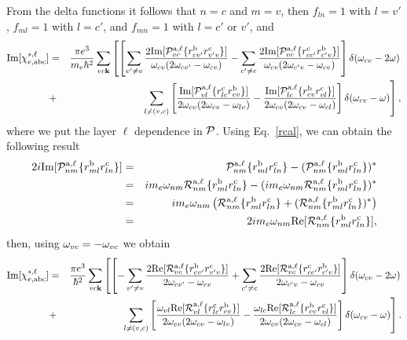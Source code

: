 \documentclass[floatfix,prb,aps,superscriptaddress,11pt,preprint]{revtex4}
\begin{document}
From the delta functions it follows that $n=c$ and $m=v$, then
$f_{ln}=1$ with $l=v'$,
$f_{ml}=1$ with $l=c'$, 
and
$f_{mn}=1$ with $l=c'$ or $v'$, and
\begin{eqnarray}\label{imchie3}
\mathrm{Im}[\chi_{e,\mathrm{a}\mathrm{b}\mathrm{c}}^{s,\ell}]
&=&
\frac{\pi e^3}{m_e\hbar^2} 
\sum_{vc\mathbf{k}}
\left[
\left[
\sum_{v'\ne v}
\frac{2\mathrm{Im}[{\cal P}^{\mathrm{a},\ell}_{vc}\{r^{\mathrm{b}}_{cv'}r^{\mathrm{c}}_{v'v}\}]
}{\omega_{cv}(2\omega_{cv'}-\omega_{cv})}
-
\sum_{c'\ne c}
\frac{2\mathrm{Im}[{\cal P}^{\mathrm{a},\ell}_{vc}\{r^{\mathrm{c}}_{cc'}r^{\mathrm{b}}_{c'v}\}]}
{\omega_{cv}(2\omega_{c'v}-\omega_{cv})}
\right]
\delta(\omega_{cv}-2\omega)
\right.
\nonumber\\
&+&
\left.
\sum_{l\neq(v,c)}
\left[
\frac{\mathrm{Im}[{\cal P}^{\mathrm{a},\ell}_{vl}\{r^{\mathrm{c}}_{lc}r^{\mathrm{b}}_{cv}\}]}
{2\omega_{cv}(2\omega_{cv}-\omega_{lv})}
-
\frac{\mathrm{Im}[{\cal P}^{\mathrm{a},\ell}_{lc}\{r^{\mathrm{b}}_{cv}r^{\mathrm{c}}_{vl}\}]}
{2\omega_{cv}(2\omega_{cv}-\omega_{cl})}
\right]
\delta(\omega_{cv}-\omega)
\right]
,
\end{eqnarray}  
where we put the layer $\ell$ dependence in ${\cal P}$.
Using Eq.~\eqref{rcal}, we can obtain the following result
\begin{eqnarray}\label{ptor}
2i\mathrm{Im}[{\cal P}^{\mathrm{a},\ell}_{nm}\{r^{\mathrm{b}}_{ml}r^{\mathrm{c}}_{ln}\}]
&=&
{\cal P}^{\mathrm{a},\ell}_{nm}\{r^{\mathrm{b}}_{ml}r^{\mathrm{c}}_{ln}\}
-
({\cal P}^{\mathrm{a},\ell}_{nm}\{r^{\mathrm{b}}_{ml}r^{\mathrm{c}}_{ln}\})^*
\nonumber\\
&=&
im_e\omega_{nm}{\cal R}^{\mathrm{a},\ell}_{nm}\{r^{\mathrm{b}}_{ml}r^{\mathrm{c}}_{ln}\}
-
(im_e\omega_{nm}{\cal R}^{\mathrm{a},\ell}_{nm}\{r^{\mathrm{b}}_{ml}r^{\mathrm{c}}_{ln}\})^*
\nonumber\\
&=&
im_e\omega_{nm}\left({\cal R}^{\mathrm{a},\ell}_{nm}\{r^{\mathrm{b}}_{ml}r^{\mathrm{c}}_{ln}\}
+
({\cal R}^{\mathrm{a},\ell}_{nm}\{r^{\mathrm{b}}_{ml}r^{\mathrm{c}}_{ln}\})^*
\right)
\nonumber\\
&=&
2im_e\omega_{nm}\mathrm{Re}[{\cal R}^{\mathrm{a},\ell}_{nm}\{r^{\mathrm{b}}_{ml}r^{\mathrm{c}}_{ln}\}]
,
\end{eqnarray}
then, using $\omega_{vc}=-\omega_{vc}$ we obtain
\begin{eqnarray}\label{imchie3n}
\mathrm{Im}[\chi_{e,\mathrm{a}\mathrm{b}\mathrm{c}}^{s,\ell}]
&=&
\frac{\pi e^3}{\hbar^2} 
\sum_{vc\mathbf{k}}
\left[
\left[
-\sum_{v'\ne v}
\frac{2\mathrm{Re}[{\cal R}^{\mathrm{a},\ell}_{vc}\{r^{\mathrm{b}}_{cv'}r^{\mathrm{c}}_{v'v}\}]
}{2\omega_{cv'}-\omega_{cv}}
+
\sum_{c'\ne c}
\frac{2\mathrm{Re}[{\cal R}^{\mathrm{a},\ell}_{vc}\{r^{\mathrm{c}}_{cc'}r^{\mathrm{b}}_{c'v}\}]}
{2\omega_{c'v}-\omega_{cv}}
\right]
\delta(\omega_{cv}-2\omega)
\right.
\nonumber\\
&+&
\left.
\sum_{l\neq(v,c)}
\left[
\frac{\omega_{vl}\mathrm{Re}[{\cal R}^{\mathrm{a},\ell}_{vl}\{r^{\mathrm{c}}_{lc}r^{\mathrm{b}}_{cv}\}]}
{2\omega_{cv}(2\omega_{cv}-\omega_{lv})}
-
\frac{\omega_{lc}\mathrm{Re}[{\cal R}^{\mathrm{a},\ell}_{lc}\{r^{\mathrm{b}}_{cv}r^{\mathrm{c}}_{vl}\}]}
{2\omega_{cv}(2\omega_{cv}-\omega_{cl})}
\right]
\delta(\omega_{cv}-\omega)
\right]
.
\end{eqnarray}  
\end{document}
